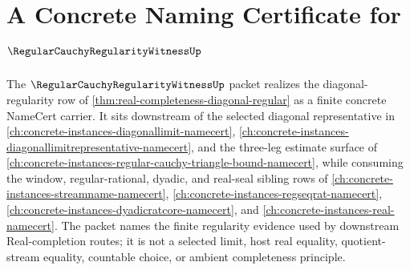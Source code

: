 \chapter{A Concrete Naming Certificate for $\RegularCauchyRegularityWitnessUp$}
\label{ch:concrete-instances-regular-cauchy-regularity-witness-namecert}

The $\RegularCauchyRegularityWitnessUp$ packet realizes the diagonal-regularity row of \autoref{thm:real-completeness-diagonal-regular} as a finite concrete NameCert carrier. It sits downstream of the selected diagonal representative in \autoref{ch:concrete-instances-diagonallimit-namecert}, \autoref{ch:concrete-instances-diagonallimitrepresentative-namecert}, and the three-leg estimate surface of \autoref{ch:concrete-instances-regular-cauchy-triangle-bound-namecert}, while consuming the window, regular-rational, dyadic, and real-seal sibling rows of \autoref{ch:concrete-instances-streamname-namecert}, \autoref{ch:concrete-instances-regseqrat-namecert}, \autoref{ch:concrete-instances-dyadicratcore-namecert}, and \autoref{ch:concrete-instances-real-namecert}. The packet names the finite regularity evidence used by downstream Real-completion routes; it is not a selected limit, host real equality, quotient-stream equality, countable choice, or ambient completeness principle.

